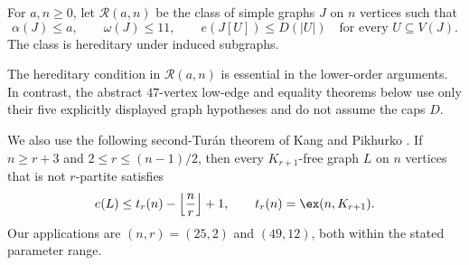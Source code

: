 \begin{definition}
For $a,n\geq0$, let $\mathcal R(a,n)$ be the class of simple graphs $J$ on $n$ vertices such that
\[
\alpha(J)\leq a,\qquad \omega(J)\leq11,\qquad
e(J[U])\leq D(|U|)\quad\text{for every }U\subseteq V(J).
\]
The class is hereditary under induced subgraphs.
\end{definition}


The hereditary condition in $\mathcal R(a,n)$ is essential in the lower-order arguments. In contrast, the abstract $47$-vertex low-edge and equality theorems below use only their five explicitly displayed graph hypotheses and do not assume the caps $D$.

We also use the following second-Tur\'an theorem of Kang and Pikhurko \cite{KangPikhurko2005}. If $n\geq r+3$ and $2\leq r\leq(n-1)/2$, then every $K_{r+1}$-free graph $L$ on $n$ vertices that is not $r$-partite satisfies
\[
e(L)\leq t_r(n)-\left\lfloor\frac nr\right\rfloor+1,
\qquad t_r(n)=\ex(n,K_{r+1}).
\]
Our applications are $(n,r)=(25,2)$ and $(49,12)$, both within the stated parameter range.
